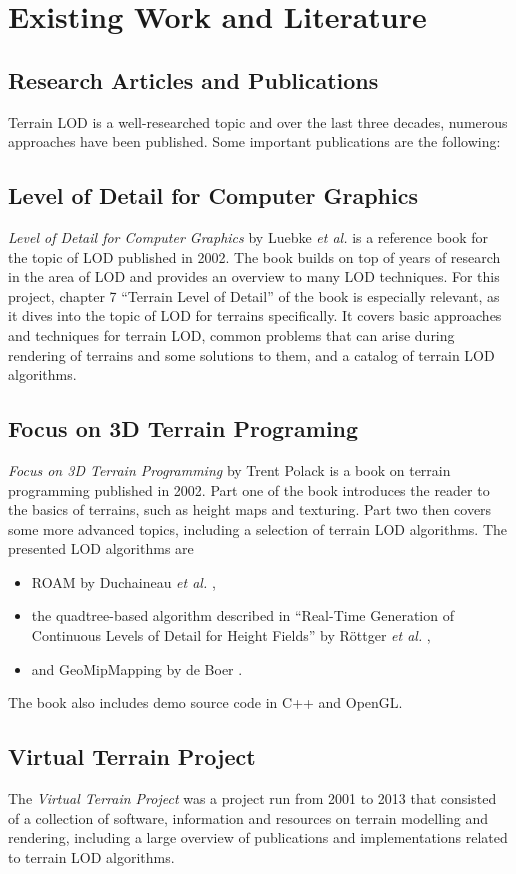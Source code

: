 \chapter{Existing Work and Literature}
\section{Research Articles and Publications}
Terrain LOD is a well-researched topic and over the last three decades, numerous approaches have been published.
Some important publications are the following: 

\section{Level of Detail for Computer Graphics}
\textit{Level of Detail for Computer Graphics} by Luebke \textit{et al.} \cite{lodfor3dgraphics} 
is a reference book for the topic of 
LOD published in 2002. The book builds on top of years of research in the 
area of LOD and provides an overview to many LOD techniques. For this project,
chapter 7 ``Terrain Level of Detail'' of the book is especially relevant, 
as it dives into the topic of LOD for terrains specifically.
It covers basic approaches and techniques for terrain LOD, 
common problems that can arise during rendering of terrains and some solutions to them, 
and a catalog of terrain LOD algorithms.

\section{Focus on 3D Terrain Programing}
\textit{Focus on 3D Terrain Programming} by Trent Polack \cite{focuson3dterrainprogramming} is a book on terrain programming published in 2002.
Part one of the book introduces the reader to the basics of terrains, such as height maps and texturing. Part two then 
covers some more advanced topics, including a selection of terrain LOD algorithms. The presented LOD algorithms are
\begin{itemize}
  \item ROAM by Duchaineau \textit{et al.} \cite{roam},
  \item the quadtree-based algorithm described in ``Real-Time Generation of Continuous Levels of Detail for Height Fields'' by Röttger \textit{et al.} \cite{rottgerpaper},
  \item and GeoMipMapping by de Boer \cite{geomipmapping}.
\end{itemize}
The book also includes demo source code in C++ and OpenGL.

\section{Virtual Terrain Project}
The \textit{Virtual Terrain Project} \cite{vtp} was a project run from 2001 to 2013 
that consisted of a collection of software, information and resources on terrain modelling and rendering,
including a large overview of publications and implementations related to terrain LOD algorithms.
